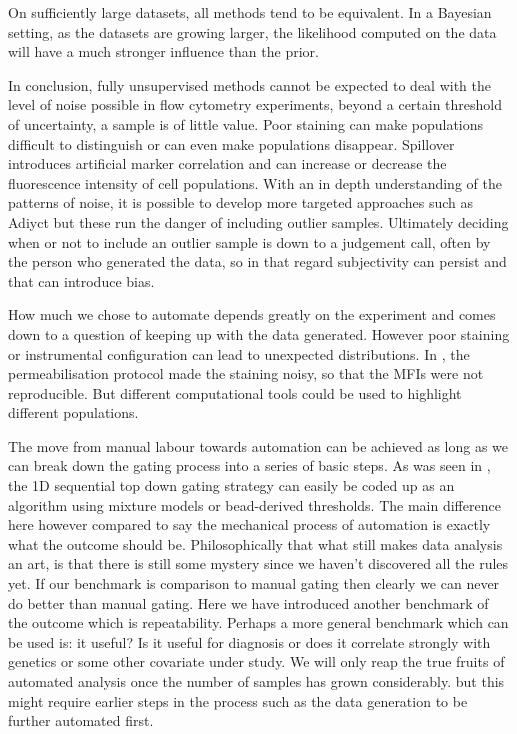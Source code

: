 On sufficiently large datasets, all methods tend to be equivalent.
In a Bayesian setting, as the datasets are growing larger, the likelihood computed on the data will have a much stronger influence than the prior.

In conclusion, fully unsupervised methods cannot be expected to deal with the level of noise possible in flow cytometry experiments, beyond a certain threshold of uncertainty, a sample is of little value.
Poor staining can make populations difficult to distinguish or can even make populations disappear.
Spillover introduces artificial marker correlation and can increase or decrease the fluorescence intensity of cell populations.  
With an in depth understanding of the patterns of noise, it is possible to develop more targeted approaches such as Adiyct but these run the danger of including outlier samples.
Ultimately deciding when or not to include an outlier sample is down to a judgement call, often by the person who generated the data, so in that regard subjectivity can persist and that can introduce bias.


How much we chose to automate depends greatly on the experiment and comes down to a question of keeping up with the data generated.
However poor staining or instrumental configuration can lead to unexpected distributions.
In , the permeabilisation protocol made the staining noisy, so that the MFIs were not reproducible.
But different computational tools could be used to highlight different populations.

The move from manual labour towards automation can be achieved as long as we can break down the gating process into a series of basic steps. 
As was seen in , the 1D sequential top down gating strategy can easily be coded up as an algorithm using mixture models or bead-derived thresholds.  
The main difference here however compared to say the mechanical process of automation is exactly what the outcome should be.
Philosophically that what still makes data analysis an art, is that there is still some mystery since we haven't discovered all the rules yet.
If our benchmark is comparison to manual gating then clearly we can never do better than manual gating.
Here we have introduced another benchmark of the outcome which is repeatability.
Perhaps a more general benchmark which can be used is: it useful?
Is it useful for diagnosis or does it correlate strongly with genetics or some other covariate under study.
We will only reap the true fruits of automated analysis once the number of samples has grown considerably.
but this might require earlier steps in the process such as the data generation to be further automated first.


